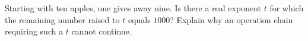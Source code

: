 Starting with ten apples, one gives away nine. Is there a real exponent $t$ for which the remaining number raised to $t$ equals $1000$? Explain why an operation chain requiring such a $t$ cannot continue.
